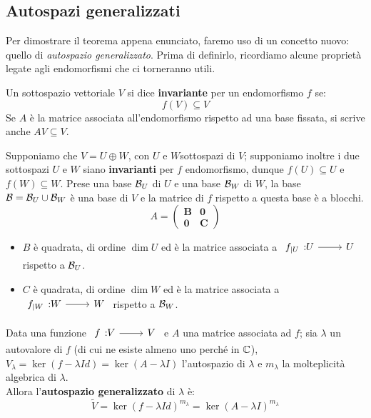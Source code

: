 \subsection{Autospazi generalizzati}
Per dimostrare il teorema appena enunciato, faremo uso di un concetto nuovo: quello di \textit{autospazio generalizzato}. Prima di definirlo, ricordiamo alcune proprietà legate agli endomorfismi che ci torneranno utili.
\begin{define}
Un sottospazio vettoriale $V$ si dice \textbf{invariante} per un endomorfismo $f$ se:
\begin{equation}
	f\left(V\right)\subseteq V
\end{equation}
Se $A$ è la matrice associata all'endomorfismo rispetto ad una base fissata, si scrive anche $AV\subseteq V$.
\end{define}
\begin{observe}\label{observejordan}
Supponiamo che $V=U\oplus W$, con $U$ e $W $sottospazi di $V$; supponiamo inoltre i due sottospazi $U$ e $W$ siano \textbf{invarianti} per $f$ endomorfismo, dunque $f\left(U\right)\subseteq U$ e $f\left(W\right)\subseteq W$. Prese una base $\mathcal{B}_U$ di $U$ e una base $\mathcal{B}_W$ di $W$, la base $\mathcal{B}=\mathcal{B}_U\cup \mathcal{B}_W$ è una base di $V$ e la matrice di $f$ rispetto a questa base è a blocchi.
\begin{equation*}
	    A = \left(
	\begin{array}{c|c}
		\mathbf{B} & \mathbf{0}\\
		\hline
		\mathbf{0} & \mathbf{C}
	\end{array}
	\right)
\end{equation*}
\begin{itemize}
	\item $B$ è quadrata, di ordine $\dim U$ ed è la matrice associata a $\funz{f_{\mid U}}{U}{U}$ rispetto a $\mathcal{B}_U$.
	\item $C$ è quadrata, di ordine $\dim W$ ed è la matrice associata a $\funz{f_{\mid W}}{W}{W}$ rispetto a $\mathcal{B}_W$.
\end{itemize}
\end{observe}
\begin{define}
Data una funzione $\funz{f}{V}{V}$ e $A$ una matrice associata ad $f$; sia $\lambda$ un autovalore di $f$ (di cui ne esiste almeno uno perché in $\mathbb{C}$), $V_{\lambda}=\ker \left(f-\lambda Id\right)=\ker \left(A-\lambda I\right)$ l'autospazio di $\lambda$ e $m_{\lambda}$ la molteplicità algebrica di $\lambda$.\\
Allora l'\textbf{autospazio generalizzato} di $\lambda$ è:
\begin{equation}
	\tilde{V}=\ker\left(f-\lambda Id\right)^{m_{\lambda}}=\ker\left(A-\lambda I\right)^{m_{\lambda}}
\end{equation}
\vspace{-6mm}
\end{define}
